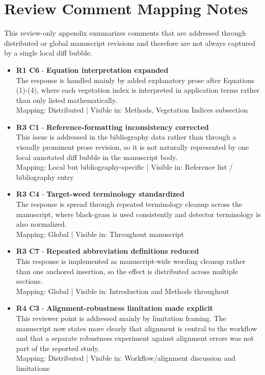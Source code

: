 \documentclass{ieeeaccess}
\begin{document}
\clearpage
\section*{Review Comment Mapping Notes}
This review-only appendix summarizes comments that are addressed through distributed or global manuscript revisions and therefore are not always captured by a single local diff bubble.
\begin{itemize}
\item \textbf{R1 C6} - \textbf{Equation interpretation expanded}\\The response is handled mainly by added explanatory prose after Equations (1)-(4), where each vegetation index is interpreted in application terms rather than only listed mathematically.\\{\footnotesize Mapping: Distributed | Visible in: Methods, Vegetation Indices subsection}
\item \textbf{R3 C1} - \textbf{Reference-formatting inconsistency corrected}\\This issue is addressed in the bibliography data rather than through a visually prominent prose revision, so it is not naturally represented by one local annotated diff bubble in the manuscript body.\\{\footnotesize Mapping: Local but bibliography-specific | Visible in: Reference list / bibliography entry}
\item \textbf{R3 C4} - \textbf{Target-weed terminology standardized}\\The response is spread through repeated terminology cleanup across the manuscript, where black-grass is used consistently and detector terminology is also normalized.\\{\footnotesize Mapping: Global | Visible in: Throughout manuscript}
\item \textbf{R3 C7} - \textbf{Repeated abbreviation definitions reduced}\\This response is implemented as manuscript-wide wording cleanup rather than one anchored insertion, so the effect is distributed across multiple sections.\\{\footnotesize Mapping: Global | Visible in: Introduction and Methods throughout}
\item \textbf{R4 C3} - \textbf{Alignment-robustness limitation made explicit}\\This reviewer point is addressed mainly by limitation framing. The manuscript now states more clearly that alignment is central to the workflow and that a separate robustness experiment against alignment errors was not part of the reported study.\\{\footnotesize Mapping: Distributed | Visible in: Workflow/alignment discussion and limitations}
\end{itemize}
\end{document}
